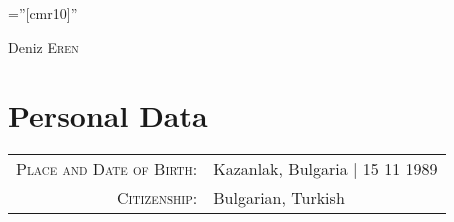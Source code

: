 \documentclass[a4paper,10pt]{article}
\begin{document}
\pagestyle{empty} %

\font\fb=''[cmr10]'' %

\par{\centering
        {\Huge Deniz \textsc{Eren}
    }\bigskip\par}

\section{Personal Data}

\begin{tabular}{rl}
    \textsc{Place and Date of Birth:} & Kazanlak, Bulgaria  | 15 11 1989 \\
    \textsc{Citizenship:}   & Bulgarian, Turkish \\
\end{tabular}

\end{document}
